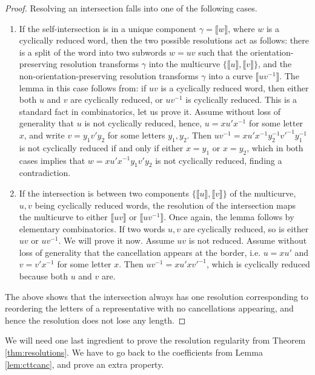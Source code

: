 \documentclass{article}
\begin{document}
	\begin{proof}
		Resolving an intersection falls into one of the following cases. 
		\begin{enumerate}
			\item If the self-intersection is in a unique component $\gamma=\llbracket w\rrbracket$, where $w$ is a cyclically reduced word, then the two possible resolutions act as follows: there is a split of the word into two subwords $w=uv$ such that the orientation-preserving resolution transforms $\gamma$ into the multicurve $\{\llbracket u\rrbracket,\llbracket v\rrbracket\}$, and the non-orientation-preserving resolution transforms $\gamma$ into a curve $\llbracket uv^{-1}\rrbracket$. The lemma in this case follows from: if $uv$ is a cyclically reduced word, then either both $u$ and $v$ are cyclically reduced, or $uv^{-1}$ is cyclically reduced. This is a standard fact in combinatorics, let us prove it. Assume without loss of generality that $u$ is not cyclically reduced, hence, $u=xu'x^{-1}$ for some letter $x$, and write $v=y_1v'y_2$ for some letters $y_1,y_2$. Then $uv^{-1}=xu'x^{-1}y_2^{-1}v'^{-1}y_1^{-1}$ is not cyclically reduced if and only if either $x=y_1$ or $x=y_2$, which in both cases implies that $w=xu'x^{-1}y_1v'y_2$ is not cyclically reduced, finding a contradiction.
			
			\item If the intersection is between two components $\{\llbracket u\rrbracket,\llbracket v\rrbracket\}$ of the multicurve, $u,v$ being cyclically reduced words, the resolution of the intersection maps the multicurve to either $\llbracket uv\rrbracket$ or $\llbracket uv^{-1}\rrbracket$. Once again, the lemma follows by elementary combinatorics. If two words $u,v$ are cyclically reduced, so is either $uv$ or $uv^{-1}$. We will prove it now. 
			Assume $uv$ is not reduced. Assume without loss of generality that the cancellation appears at the border, i.e. $u=xu'$ and $v=v'x^{-1}$ for some letter $x$. Then $uv^{-1}=xu'xv'^{-1}$, which is cyclically reduced because both $u$ and $v$ are.
		\end{enumerate}
		The above shows that the intersection always has one resolution corresponding to reordering the letters of a representative with no cancellations appearing, and hence the resolution does not lose any length.
	\end{proof}
	
	We will need one last ingredient to prove the resolution regularity from Theorem \ref{thm:resolutions}. We have to go back to the coefficients from Lemma \ref{lem:cttcanc}, and prove an extra property.
	
\end{document}
